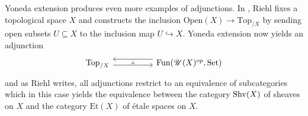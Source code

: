 \documentclass[../../thesis.tex]{subfiles}
\begin{document}
Yoneda extension produces even more examples of adjunctions.
In \cite[Exercise 6.5.iii.]{CatContext}, Riehl fixes a topological space $X$ and constructs the inclusion $\mathrm{Open}(X) \to \mathrm{Top}_{/X}$ by sending open subsets $U \subseteq X$ to the inclusion map $U\hookrightarrow X$.
Yoneda extension now yields an adjunction
\[\begin{tikzcd}
        {\mathrm{Top}_{/X}} && {\Fun(\Open(X)^{op},\SET)}
        \arrow[""{name=0, anchor=center, inner sep=0}, shift right=1, from=1-1, to=1-3]
        \arrow[""{name=1, anchor=center, inner sep=0}, shift right=2, from=1-3, to=1-1]
        \arrow["\dashv"{anchor=center, rotate=-90}, draw=none, from=1, to=0]
    \end{tikzcd}\]
and as Riehl writes, all adjunctions restrict to an equivalence of subcategories which in this case yields the equivalence between the category $\mathrm{Shv}(X)$ of sheaves on $X$ and the category $\mathrm{Et}(X)$ of étale spaces on $X$.
\end{document}
